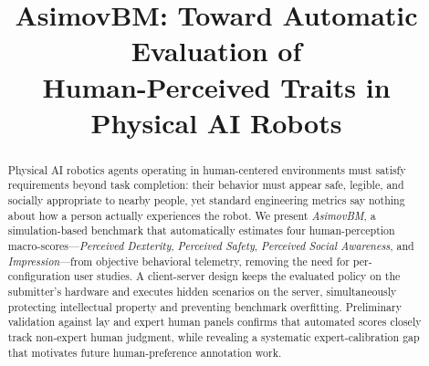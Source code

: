 \documentclass[conference]{IEEEtran}
\begin{document}
\title{AsimovBM: Toward Automatic Evaluation of\\
Human-Perceived Traits in Physical AI 
Robots
}

\author{
}

\maketitle

\begin{abstract}
Physical AI robotics agents operating in human-centered environments must
satisfy requirements beyond task completion: their behavior must appear safe,
legible, and socially appropriate to nearby people, yet standard engineering
metrics say nothing about how a person actually experiences the robot.
We present \textit{AsimovBM}, a simulation-based benchmark that automatically
estimates four human-perception macro-scores---\textit{Perceived Dexterity},
\textit{Perceived Safety}, \textit{Perceived Social Awareness}, and
\textit{Impression}---from objective behavioral telemetry, removing the need
for per-configuration user studies.
A client-server design keeps the evaluated policy on the submitter's hardware
and executes hidden scenarios on the server, simultaneously protecting
intellectual property and preventing benchmark overfitting.
Preliminary validation against lay and expert human panels confirms that
automated scores closely track non-expert human judgment, while revealing
a systematic expert-calibration gap that motivates future human-preference
annotation work.
\end{abstract}
\end{document}
